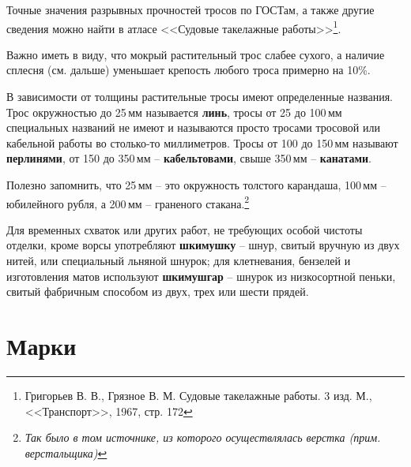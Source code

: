 \documentclass[a4paper, 12pt, twoside, final]{scrbook}
\begin{document}
Точные значения разрывных прочностей тросов по ГОСТам, а также другие сведения можно найти в атласе <<Судовые такелажные работы>>\footnote{Григорьев В. В., Грязное В. М. Судовые такелажные работы. 3 изд. М., <<Транспорт>>, 1967, стр. 172}.

Важно иметь в виду, что мокрый растительный трос слабее сухого, а наличие сплесня (см. дальше) уменьшает крепость любого троса примерно на 10\%.

В зависимости от толщины растительные тросы имеют определенные названия. Трос окружностью до 25\,мм называется \textbf{линь}, тросы от 25 до 100\,мм специальных названий не имеют и называются просто тросами тросовой или кабельной работы во столько-то миллиметров. Тросы от 100 до 150\,мм называют \textbf{перлинями}, от 150 до 350\,мм \--- \textbf{кабельтовами}, свыше 350\,мм \--- \textbf{канатами}.{\sloppy\par}

Полезно запомнить, что 25\,мм \--- это окружность толстого карандаша, 100\,мм \---юбилейного рубля, а 200\,мм \--- граненого стакана.\footnote{\textit{Так было в том источнике, из которого осуществлялась верстка (прим. верстальщика)}}

Для временных схваток или других работ, не требующих особой чистоты отделки, кроме ворсы употребляют \textbf{шкимушку} \--- шнур, свитый вручную из двух нитей, или специальный льняной шнурок; для клетневания, бензелей и изготовления матов используют \textbf{шкимушгар} \--- шнурок из низкосортной пеньки, свитый фабричным способом из двух, трех или шести прядей.

\section{Марки}
\end{document}

